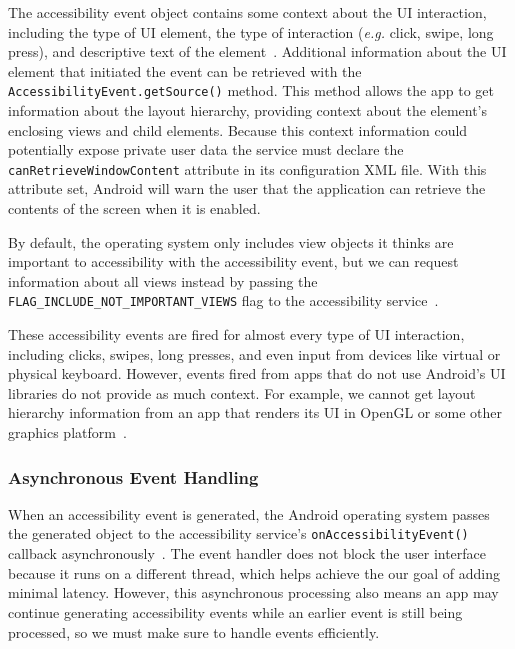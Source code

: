 The accessibility event object contains some context about the UI interaction,
including the type of UI element, the type of interaction (\textit{e.g.} click,
swipe, long press), and descriptive text of the
element~\cite{accessibilityserviceguide}. Additional information about the UI
element that initiated the event can be retrieved with the
\texttt{AccessibilityEvent.getSource()} method. This method allows the app to
get information about the layout hierarchy, providing context about the
element's enclosing views and child elements. Because this context information
could potentially expose private user data the service must declare the
\texttt{canRetrieveWindowContent} attribute in its configuration XML file. With
this attribute set, Android will warn the user that the application can retrieve
the contents of the screen when it is enabled.

By default, the operating system only includes view objects it thinks are
important to accessibility with the accessibility event, but we can request
information about all views instead by passing the 
\texttt{FLAG\_INCLUDE\_NOT\_IMPORTANT\_VIEWS} flag to the accessibility
service~\cite{accessibilityserviceguide}.

These accessibility events are fired for almost every type of UI interaction,
including clicks, swipes, long presses, and even input from devices like virtual
or physical keyboard. However, events fired from apps that do not use Android's
UI libraries do not provide as much context. For example, we cannot get layout
hierarchy information from an app that renders its UI in OpenGL or some other
graphics platform~\cite{accessibilityserviceguide}.


\subsubsection{Asynchronous Event Handling}
\label{sec:asynchronous-event-handling}

When an accessibility event is generated, the Android operating system passes
the generated object to the accessibility service's
\texttt{onAccessibilityEvent()} callback
asynchronously~\cite{googledevelopers2020}. The event handler does not block the
user interface because it runs on a different thread, which helps achieve the
our goal of adding minimal latency. However, this asynchronous processing also
means an app may continue generating accessibility events while an earlier event
is still being processed, so we must make sure to handle events efficiently.

